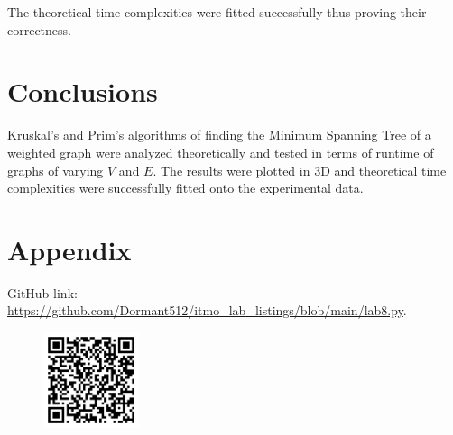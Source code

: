 \documentclass[12pt, a4paper]{article}
\begin{document}
\noindent
The theoretical time complexities were fitted successfully thus proving their correctness.

\newpage

\section*{Conclusions}

Kruskal's and Prim's algorithms of finding the Minimum Spanning Tree of a weighted graph were analyzed theoretically and tested in terms of runtime of graphs of varying $V$ and $E$. The results were plotted in 3D and theoretical time complexities were successfully fitted onto the experimental data.

\section*{Appendix}

GitHub link: \url{https://github.com/Dormant512/itmo_lab_listings/blob/main/lab8.py}.

\begin{figure}[!h]
\centering
\includegraphics[width=0.25\textwidth]{lab8.png}
\end{figure}
\end{document}
